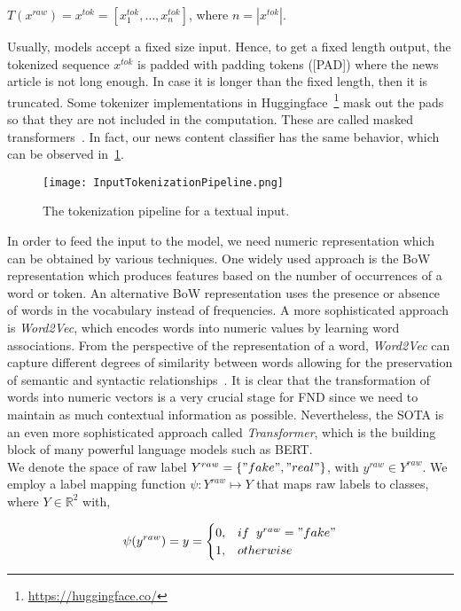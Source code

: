 \begin{center}
    $T(x^{raw}) = x^{tok} = [x_1^{tok}, \dots, x_n^{tok}]$, where $n = |x^{tok}|$.
\end{center}
Usually, models accept a fixed size input. Hence, to get a fixed length output, the tokenized sequence $x^{tok}$ is padded with padding tokens ([PAD]) where the news article is not long enough. In case it is longer than the fixed length, then it is truncated. Some tokenizer implementations in Huggingface~\footnote{\url{https://huggingface.co/}} mask out the pads so that they are not included in the computation. These are called masked transformers~\parencite{Transformers_Wolf}. In fact, our news content classifier has the same behavior, which can be observed in~\ref{fig:InputTokenizationPipeline}.\\
\begin{figure}
    \centering
    \texttt{[image: InputTokenizationPipeline.png]}
    \caption[The tokenization pipeline for a textual input.]{The tokenization pipeline for a textual input.}
    \label{fig:InputTokenizationPipeline}
\end{figure}
In order to feed the input to the model, we need numeric representation which can be obtained by various techniques. One widely used approach is the BoW representation which produces features based on the number of occurrences of a word or token. An alternative BoW representation uses the presence or absence of words in the vocabulary instead of frequencies. A more sophisticated approach is \emph{Word2Vec}, which encodes words into numeric values by learning word associations. From the perspective of the representation of a word, \emph{Word2Vec} can capture different degrees of similarity between words allowing for the preservation of semantic and syntactic relationships~\parencite{Word2Vec_Mikolov}. It is clear that the transformation of words into numeric vectors is a very crucial stage for FND since we need to maintain as much contextual information as possible. Nevertheless, the SOTA is an even more sophisticated approach called \emph{Transformer}, which is the building block of many powerful language models such as BERT.\\
We denote the space of raw label $Y^{raw} = \{"fake", "real"\}$, with $y^{raw} \in Y^{raw}$. We employ a label mapping function $\psi: Y^{raw} \mapsto Y$ that maps raw labels to classes, where $Y \in \mathbb{R}^2$ with,
\begin{center}
    \[\psi(y^{raw}) = y =
        \begin{cases}
            0, & if \;\; y^{raw} = "fake" \\
            1, & otherwise                \\
        \end{cases}
    \]
\end{center}
